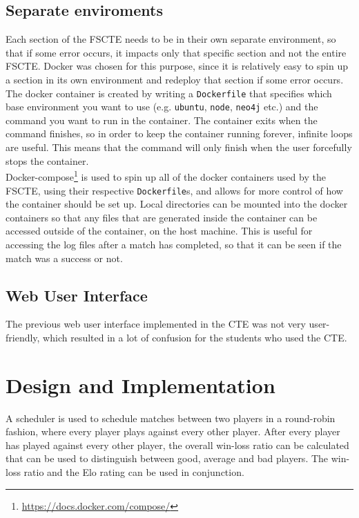 \documentclass[a4paper, 12pt]{report}
\begin{document}
\section{Separate enviroments}

Each section of the FSCTE needs to be in their own separate environment, so that
if some error occurs, it impacts only that specific section and not the entire
FSCTE. Docker was chosen for this purpose, since it is relatively easy to spin
up a section in its own environment and redeploy that section if some error
occurs. \\

The docker container is created by writing a \texttt{Dockerfile} that
specifies which base environment you want to use (e.g. \texttt{ubuntu},
\texttt{node}, \texttt{neo4j} etc.) and the command you want to run in the
container. The container exits when the command finishes, so in order to keep
the container running forever, infinite loops are useful. This means that the
command will only finish when the user forcefully stops the container. \\

Docker-compose\footnote{\url{https://docs.docker.com/compose/}} is used to spin
up all of the docker containers used by the FSCTE,
using their respective \texttt{Dockerfile}s, and allows for more control of how
the container should be set up. Local directories can be mounted into the docker
containers so that any files that are generated inside the container can be
accessed outside of the container, on the host machine. This is useful for
accessing the log files after a match has completed, so that it can be seen if
the match was a success or not.

\section{Web User Interface}

The previous web user interface implemented in the CTE was not very user-friendly,
which resulted in a lot of confusion for the students who used the CTE.

\chapter{Design and Implementation}
\label{chap:design}

A scheduler is used to schedule matches between two players in a round-robin
\mbox{fashion}, where every player plays against every other player. After every player
has played against every other player, the overall win-loss ratio can be calculated
that can be used to \mbox{distinguish} between good, average and bad players. The
win-loss ratio and the Elo rating \cite{elo} can be used in conjunction. \\
\end{document}
